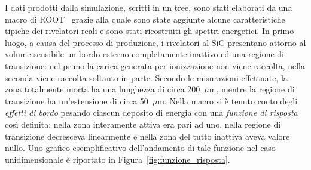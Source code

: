I dati prodotti dalla simulazione, scritti in un tree, sono stati elaborati da una macro di ROOT~\cite{brun:nima97} grazie alla quale sono state aggiunte alcune caratteristiche tipiche dei rivelatori reali e sono stati ricostruiti gli spettri energetici.
%
In primo luogo, a causa del processo di produzione, i rivelatori al SiC presentano attorno al volume sensibile un bordo esterno completamente inattivo ed una regione di transizione: nel primo la carica generata per ionizzazione non viene raccolta, nella seconda viene raccolta soltanto in parte.
Secondo le misurazioni effettuate, la zona totalmente morta ha una lunghezza di circa 200~$\mu$m, mentre la regione di transizione ha un'estensione di circa 50~$\mu$m. 
%
Nella macro si è tenuto conto degli \emph{effetti di bordo} pesando ciascun deposito di energia con una \emph{funzione di risposta} così definita: nella zona interamente attiva era pari ad uno, nella regione di transizione decresceva linearmente e nella zona del tutto inattiva aveva valore nullo.
Uno grafico esemplificativo dell'andamento di tale funzione nel caso unidimensionale è riportato in Figura~\ref{fig:funzione_risposta}.


